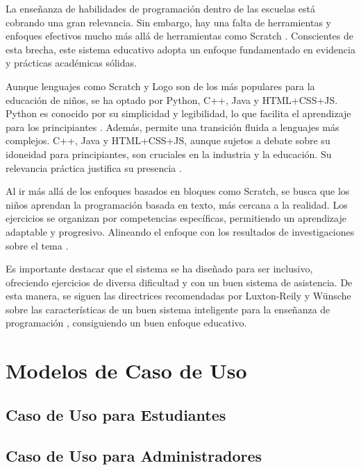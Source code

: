 La enseñanza de habilidades de programación dentro de las escuelas está cobrando una gran relevancia. Sin embargo, hay una falta de herramientas y enfoques efectivos mucho más allá de herramientas como Scratch \cite{teachingcodingchildren}. Conscientes de esta brecha, este sistema educativo adopta un enfoque fundamentado en evidencia y prácticas académicas sólidas.

Aunque lenguajes como Scratch y Logo son de los más populares para la educación de niños, se ha optado por Python, C++, Java y HTML+CSS+JS. Python es conocido por su simplicidad y legibilidad, lo que facilita el aprendizaje para los principiantes \cite{pears2007}. Además, permite una transición fluida a lenguajes más complejos. C++, Java y HTML+CSS+JS, aunque sujetos a debate sobre su idoneidad para principiantes, son cruciales en la industria y la educación. Su relevancia práctica justifica su presencia \cite{dewarschonberg}.

Al ir más allá de los enfoques basados en bloques como Scratch, se busca que los niños aprendan la programación basada en texto, más cercana a la realidad. Los ejercicios se organizan por competencias específicas, permitiendo un aprendizaje adaptable y progresivo. Alineando el enfoque con los resultados de investigaciones sobre el tema \cite{document2010}. 

Es importante destacar que el sistema se ha diseñado para ser inclusivo, ofreciendo ejercicios de diversa dificultad y con un buen sistema de asistencia. De esta manera, se siguen las directrices recomendadas por Luxton-Reily y Wünsche sobre las características de un buen sistema inteligente para la enseñanza de programación \cite{intelligentturoingprogrammingeducation}, consiguiendo un buen enfoque educativo.

\section{Modelos de Caso de Uso}

\subsection{Caso de Uso para Estudiantes}

\subsection{Caso de Uso para Administradores}

